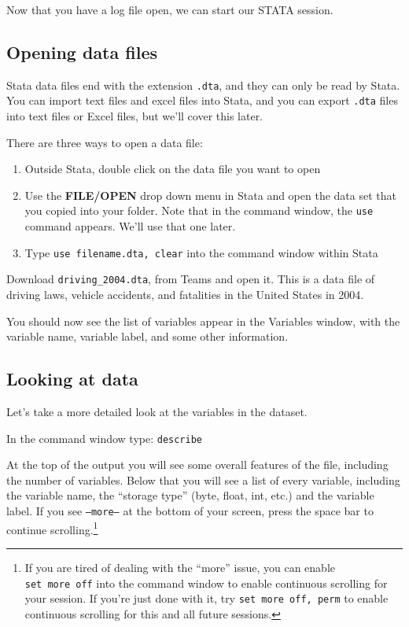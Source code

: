 \documentclass[
]{article}
\begin{document}
Now that you have a log file open, we can start our STATA session.

\hypertarget{opening-data-files}{%
\subsection{Opening data files}\label{opening-data-files}}

Stata data files end with the extension \texttt{.dta}, and they can only
be read by Stata. You can import text files and excel files into Stata,
and you can export \texttt{.dta} files into text files or Excel files,
but we'll cover this later.

There are three ways to open a data file:

\begin{enumerate}
\def\labelenumi{\arabic{enumi}.}
\item
  Outside Stata, double click on the data file you want to open
\item
  Use the \textbf{FILE/OPEN} drop down menu in Stata and open the data
  set that you copied into your folder. Note that in the command window,
  the \texttt{use} command appears. We'll use that one later.
\item
  Type \texttt{use\ filename.dta,\ clear} into the command window within
  Stata
\end{enumerate}

Download \texttt{driving\_2004.dta}, from Teams and open it. This is a
data file of driving laws, vehicle accidents, and fatalities in the
United States in 2004.

You should now see the list of variables appear in the Variables window,
with the variable name, variable label, and some other information.

\hypertarget{looking-at-data}{%
\subsection{Looking at data}\label{looking-at-data}}

Let's take a more detailed look at the variables in the dataset.

In the command window type: \texttt{describe}

At the top of the output you will see some overall features of the file,
including the number of variables. Below that you will see a list of
every variable, including the variable name, the ``storage type'' (byte,
float, int, etc.) and the variable label. If you see \texttt{–more–} at
the bottom of your screen, press the space bar to continue
scrolling.\footnote{If you are tired of dealing with the ``more'' issue,
  you can enable \texttt{set\ more\ off} into the command window to
  enable continuous scrolling for your session. If you're just done with
  it, try \texttt{set\ more\ off,\ perm} to enable continuous scrolling
  for this and all future sessions.}
\end{document}

